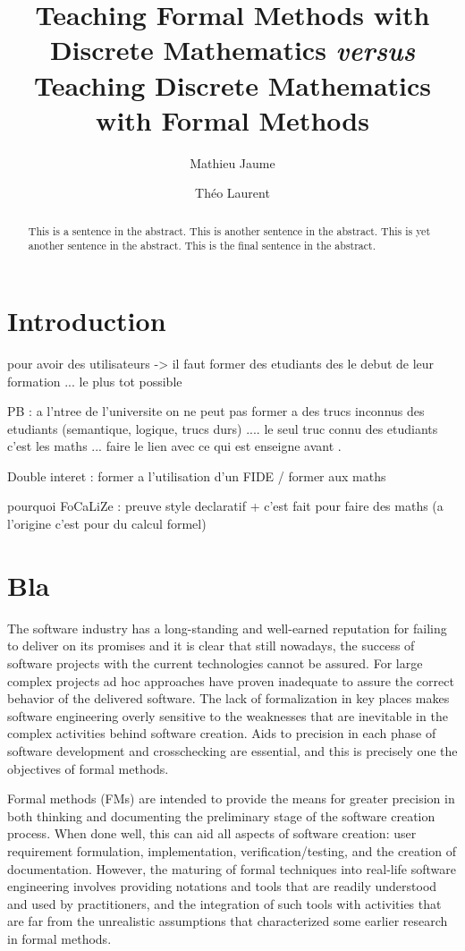 \documentclass[submission,copyright,creativecommons]{eptcs}
\title{Teaching Formal Methods with Discrete Mathematics  {\it versus} 
  Teaching Discrete Mathematics with Formal Methods}
\author{Mathieu Jaume
\institute{Sorbonne Universit\'es, UPMC Univ. Paris 06 \\ UMR 7606 ,
  LIP6 \\  F-75005, Paris, France}
\email{Mathieu.Jaume@lip6.fr}
\and Th\'eo Laurent
\institute{Sorbonne Universit\'es, UPMC Univ. Paris 06 \\ F-75005, Paris, France}
\email{Theo.Laurent@etu.upmc.fr}
}
\def\focalize{FoCaLiZe \mbox{}}
\begin{document}
\maketitle

\begin{abstract}
This is a sentence in the abstract.
This is another sentence in the abstract.
This is yet another sentence in the abstract.
This is the final sentence in the abstract.
\end{abstract}

\section{Introduction}

pour avoir des utilisateurs -> il faut former des etudiants des le
debut de leur formation ... le plus tot possible

PB : a l'ntree de l'universite on ne peut pas former a des trucs
inconnus des etudiants (semantique, logique, trucs durs) .... le seul
truc connu
des etudiants c'est les maths ... faire le lien avec ce qui est
enseigne avant .

Double interet : former a l'utilisation d'un FIDE / former aux maths

pourquoi \focalize : preuve style declaratif + c'est fait pour faire
des maths (a l'origine c'est pour du calcul formel)


\section{Bla}



The software industry has a long-standing and well-earned reputation for
failing to deliver on its promises and it is clear that still nowadays, the
success of software projects with the current technologies cannot be assured.
For large complex projects ad hoc approaches have proven inadequate to assure
the correct behavior of the delivered software. The lack of formalization in
key places makes software engineering overly sensitive to the weaknesses that
are inevitable in the complex activities behind software creation. Aids to
precision in each phase of software development and crosschecking are
essential, and this is precisely one the objectives of formal methods.

Formal methods (FMs) are intended to provide the means for greater precision in
both thinking and documenting the preliminary stage of the software creation
process. When done well, this can aid all aspects of software creation: user
requirement formulation, implementation, verification/testing, and the creation
of documentation. However, the maturing of formal techniques into real-life
software engineering involves providing notations and tools that are readily
understood and used by practitioners, and the integration of such tools with
activities that are far from the unrealistic assumptions that characterized
some earlier research in formal methods.
\end{document}
